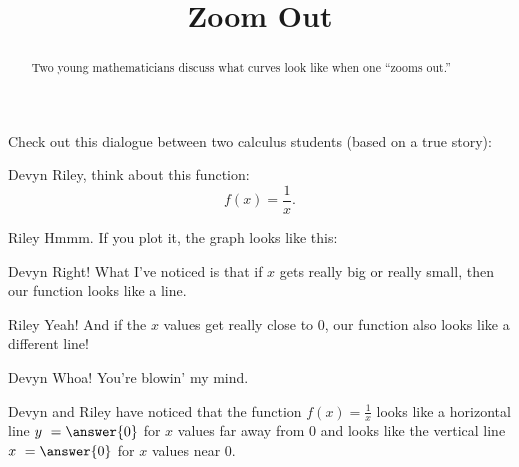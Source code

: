 \documentclass{ximera}
\title[Break-Ground:]{Zoom Out}
\begin{document}
\begin{abstract}
Two young mathematicians discuss what curves look like when one
``zooms out.''
\end{abstract}
\maketitle

Check out this dialogue between two calculus students (based on a true
story):

\begin{dialogue}
\item[Devyn] Riley, think about this function:
  \[
  f(x) = \frac{1}{x}.
  \]
\item[Riley] Hmmm. If you plot it, the graph looks like this:
\begin{image}
\end{image}
\item[Devyn] Right! What I've noticed is that if $x$ gets really big or really small, then
  our function looks like a line.
\item[Riley] Yeah!  And if the $x$ values get really close to $0$, our function also looks like a different line! 
\item[Devyn] Whoa!  You're blowin' my mind. 
\end{dialogue}

\begin{problem}
Devyn and Riley have noticed that the function $f(x) = \frac{1}{x}$ looks like a horizontal line $y \ = \answer{0}$ for $x$ values far away from $0$ and looks like the vertical line $x \ = \answer{0}$ for $x$ values near $0$.  
\end{problem}
\end{document}
